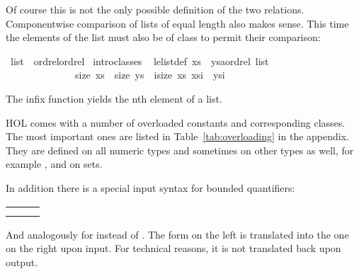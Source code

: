 %
\begin{isabellebody}%
\def\isabellecontext{Overloading{\isadigit{2}}}%
%
\begin{isamarkuptext}%
Of course this is not the only possible definition of the two relations.
Componentwise comparison of lists of equal length also makes sense. This time
the elements of the list must also be of class  to permit their
comparison:%
\end{isamarkuptext}%
\ list\ {\isacharcolon}{\isacharcolon}\ {\isacharparenleft}ordrel{\isacharparenright}ordrel\isanewline
{}\ intro{\isacharunderscore}classes\isanewline
\isanewline
{}\ {\isacharparenleft}\isanewline
le{\isacharunderscore}list{\isacharunderscore}def{\isacharcolon}\ {\isachardoublequote}xs\ {\isacharless}{\isacharless}{\isacharequal}\ {\isacharparenleft}ys{\isacharcolon}{\isacharcolon}{\isacharprime}a{\isacharcolon}{\isacharcolon}ordrel\ list{\isacharparenright}\ {\isasymequiv}\isanewline
\ \ \ \ \ \ \ \ \ \ \ \ \ \ size\ xs\ {\isacharequal}\ size\ ys\ {\isasymand}\ {\isacharparenleft}{\isasymforall}i{\isacharless}size\ xs{\isachardot}\ xs{\isacharbang}i\ {\isacharless}{\isacharless}{\isacharequal}\ ys{\isacharbang}i{\isacharparenright}{\isachardoublequote}%
\begin{isamarkuptext}%
\noindent
The infix function \isa{{\isacharbang}} yields the nth element of a list.%
\end{isamarkuptext}%
%
%
\begin{isamarkuptext}%
HOL comes with a number of overloaded constants and corresponding classes.
The most important ones are listed in Table~\ref{tab:overloading} in the appendix. They are
defined on all numeric types and sometimes on other types as well, for example
\isa{{\isacharminus}}, \isa{{\isasymle}} and \isa{{\isacharless}} on sets.

In addition there is a special input syntax for bounded quantifiers:
\begin{center}
\begin{tabular}{lcl}
\isa{{\isasymforall}x\ {\isasymle}\ y{\isachardot}\ P\ x} & \isa{{\isasymrightharpoonup}} & \isa{{\isasymforall}x{\isachardot}\ x\ {\isasymle}\ y\ {\isasymlongrightarrow}\ P\ x} \\
\isa{{\isasymexists}x\ {\isasymle}\ y{\isachardot}\ P\ x} & \isa{{\isasymrightharpoonup}} & \isa{{\isasymexists}x{\isachardot}\ x\ {\isasymle}\ y\ {\isasymand}\ P\ x}
\end{tabular}
\end{center}
And analogously for \isa{{\isacharless}} instead of \isa{{\isasymle}}.
The form on the left is translated into the one on the right upon input.
For technical reasons, it is not translated back upon output.%
\end{isamarkuptext}%
\end{isabellebody}%
